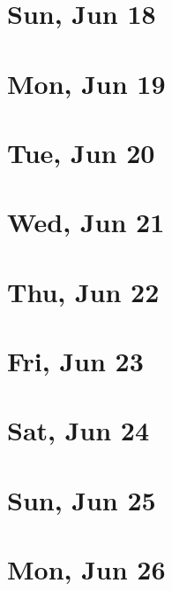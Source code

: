 	\section{Sun, Jun 18}
		
		
	\section{Mon, Jun 19}
		
		
	\section{Tue, Jun 20}
		
		
	\section{Wed, Jun 21}
		
		
	\section{Thu, Jun 22}
		
		
	\section{Fri, Jun 23}
		
		
	\section{Sat, Jun 24}
		
		
	\section{Sun, Jun 25}
		
		
	\section{Mon, Jun 26}
		
		
